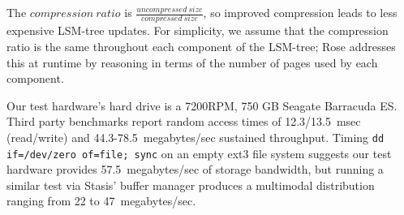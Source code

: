 \documentclass{vldb}
\newcommand{\rows}{Rose\xspace}
\begin{document}
%
%
%

The $compression~ratio$ is
$\frac{uncompressed~size}{compressed~size}$, so improved compression
leads to less expensive LSM-tree updates.  For simplicity, we assume
that the compression ratio is the same throughout each component of
the LSM-tree; \rows addresses this at runtime by reasoning in terms
of the number of pages used by each component.

Our test hardware's hard drive is a 7200RPM, 750 GB Seagate Barracuda
ES.  
Third party
benchmarks\cite{hdBench} %
report random access times of 12.3/13.5~msec (read/write) and 44.3-78.5~megabytes/sec
sustained throughput.  Timing {\tt dd if=/dev/zero of=file; sync} on an
empty ext3 file system suggests our test hardware provides 57.5~megabytes/sec of
storage bandwidth, but running a similar test via Stasis' buffer manager produces
a multimodal distribution ranging from 22 to 47~megabytes/sec.

\end{document}
